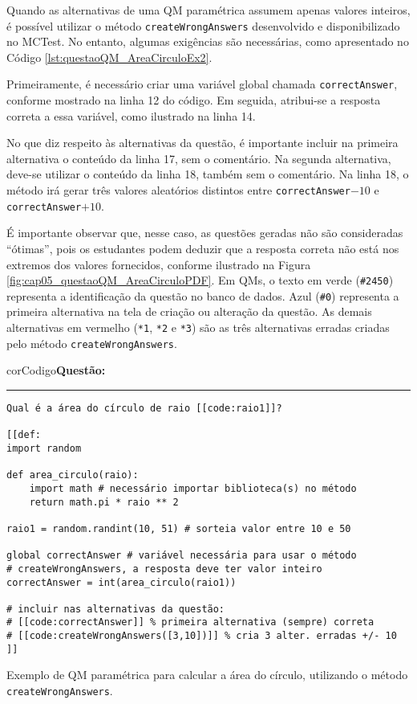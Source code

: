 Quando as alternativas de uma QM paramétrica assumem apenas valores inteiros, é possível utilizar o método \verb|createWrongAnswers| desenvolvido e disponibilizado no MCTest. No entanto, algumas exigências são necessárias, como apresentado no Código \ref{lst:questaoQM_AreaCirculoEx2}. 

Primeiramente, é necessário criar uma variável global chamada \verb|correctAnswer|, conforme mostrado na linha 12 do código. Em seguida, atribui-se a resposta correta a essa variável, como ilustrado na linha 14. 

No que diz respeito às alternativas da questão, é importante incluir na primeira alternativa o conteúdo da linha 17, sem o comentário. Na segunda alternativa, deve-se utilizar o conteúdo da linha 18, também sem o comentário. Na linha 18, o método irá gerar três valores aleatórios distintos entre \verb|correctAnswer|$-10$ e \verb|correctAnswer|$+10$. 

É importante observar que, nesse caso, as questões geradas não são consideradas ``ótimas'', pois os estudantes podem deduzir que a resposta correta não está nos extremos dos valores fornecidos, conforme ilustrado na Figura \ref{fig:cap05_questaoQM_AreaCirculoPDF}. 
Em QMs, o texto em verde (\verb|#2450|) representa a identificação da questão no banco de dados. Azul (\verb|#0|) representa a primeira alternativa na tela de criação ou alteração da questão. As demais alternativas em vermelho (\verb|*1|, \verb|*2| e \verb|*3|) são as três alternativas erradas criadas pelo método \verb|createWrongAnswers|.


\begin{listing}[!ht]
\begin{myboxCode}{corCodigo}{\textbf{Questão: }}\vspace{3mm}
\hrule
\begin{verbatim}
Qual é a área do círculo de raio [[code:raio1]]?

[[def:
import random

def area_circulo(raio): 
    import math # necessário importar biblioteca(s) no método
    return math.pi * raio ** 2

raio1 = random.randint(10, 51) # sorteia valor entre 10 e 50

global correctAnswer # variável necessária para usar o método 
# createWrongAnswers, a resposta deve ter valor inteiro
correctAnswer = int(area_circulo(raio1)) 

# incluir nas alternativas da questão: 
# [[code:correctAnswer]] % primeira alternativa (sempre) correta
# [[code:createWrongAnswers([3,10])]] % cria 3 alter. erradas +/- 10
]]
\end{verbatim}
\end{myboxCode}
\caption{Exemplo de QM paramétrica para calcular a área do círculo, utilizando o método \texttt{createWrongAnswers}.}
\label{lst:questaoQM_AreaCirculoEx2}
\end{listing}

